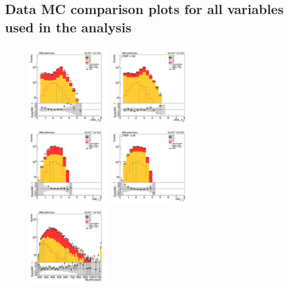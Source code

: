 \subsection{Data MC comparison plots for all variables used in the analysis}


\begin{figure}[tbp]
  \begin{center}
    \includegraphics[width=0.31\textwidth]{figures/ee_300_april18/dR_bjets_ee_CRDY_prefit_plot_apr18.png}
    \includegraphics[width=0.31\textwidth]{figures/ee_300_april18/dR_bjets_ee_CRDY_FullPostfit_plot_apr18.png}\\
    \includegraphics[width=0.31\textwidth]{figures/ee_300_april18/dR_leps_ee_CRDY_prefit_plot_apr18.png}
    \includegraphics[width=0.31\textwidth]{figures/ee_300_april18/dR_leps_ee_CRDY_FullPostfit_plot_apr18.png}\\
    \includegraphics[width=0.31\textwidth]{figures/ee_300_april18/hhMt_ee_CRDY_prefit_plot_apr18.png}

\end{center}
\end{figure}
